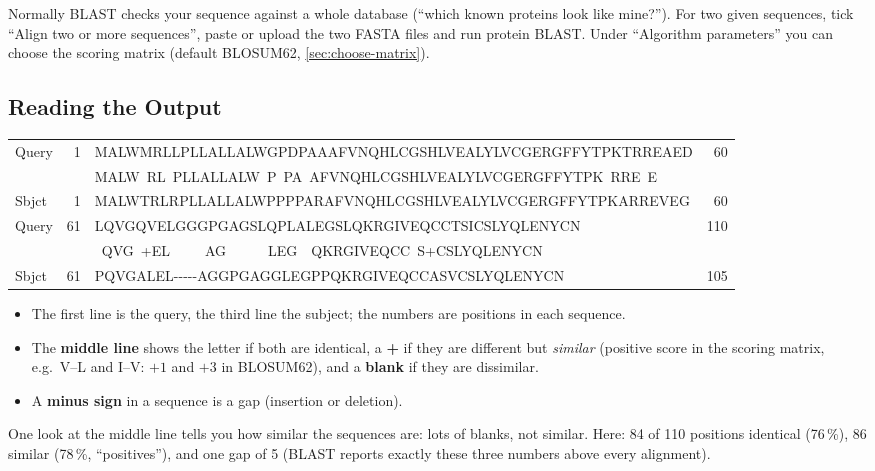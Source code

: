 \documentclass[11pt, oneside]{book}
\let\originalsubsection\subsection
\renewcommand{\subsection}{\Needspace{6\baselineskip}\originalsubsection}
\begin{document}
Normally BLAST checks your sequence against a whole database (``which known
proteins look like mine?''). For two given sequences, tick ``Align two or more
sequences'', paste or upload the two FASTA files and run protein BLAST. Under
``Algorithm parameters'' you can choose the scoring matrix (default BLOSUM62,
\cref{sec:choose-matrix}).

\subsection{Reading the Output}

\begin{center}
\ttfamily\footnotesize
\begin{tabular}{@{}l@{\;}r@{\;\;}l@{\;\;}r@{}}
Query & 1  & MALWMRLLPLLALLALWGPDPAAAFVNQHLCGSHLVEALYLVCGERGFFYTPKTRREAED & 60 \\
      &    & MALW~RL~PLLALLALW~P~PA~AFVNQHLCGSHLVEALYLVCGERGFFYTPK~RRE~E~ & \\
Sbjct & 1  & MALWTRLRPLLALLALWPPPPARAFVNQHLCGSHLVEALYLVCGERGFFYTPKARREVEG & 60 \\[1ex]
Query & 61 & LQVGQVELGGGPGAGSLQPLALEGSLQKRGIVEQCCTSICSLYQLENYCN & 110 \\
      &    & ~QVG~+EL~~~~~AG~~~~~~LEG~~QKRGIVEQCC~S+CSLYQLENYCN & \\
Sbjct & 61 & PQVGALEL-{}-{}-{}-{}-AGGPGAGGLEGPPQKRGIVEQCCASVCSLYQLENYCN & 105 \\
\end{tabular}
\end{center}

\begin{itemize}
  \item The first line is the query, the third line the subject; the numbers
    are positions in each sequence.
  \item The \textbf{middle line} shows the letter if both are identical, a
    \textbf{+} if they are different but \emph{similar} (positive score in the
    scoring matrix, e.g.\ V--L and I--V: $+1$ and $+3$ in BLOSUM62), and a
    \textbf{blank} if they are dissimilar.
  \item A \textbf{minus sign} in a sequence is a gap (insertion or deletion).
\end{itemize}
One look at the middle line tells you how similar the sequences are: lots of
blanks, not similar. Here: 84 of 110 positions identical (76\,\%), 86 similar
(78\,\%, ``positives''), and one gap of 5 (BLAST reports exactly these three
numbers above every alignment).
\end{document}
